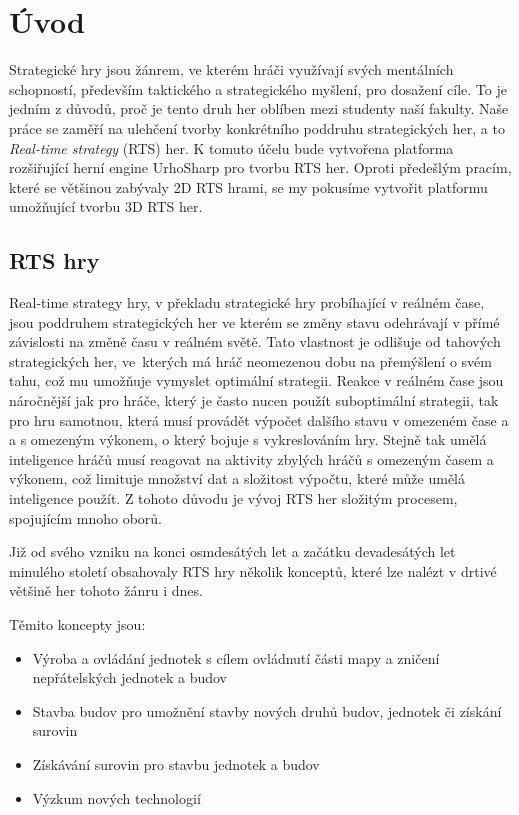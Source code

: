 \chapter{Úvod}

Strategické hry jsou žánrem, ve kterém hráči využívají svých mentálních schopností, především taktického a strategického myšlení, pro dosažení cíle. To je jedním z důvodů, proč je tento druh her oblíben mezi studenty naší fakulty. Naše práce se zaměří na ulehčení tvorby konkrétního poddruhu strategických her, a to \emph{Real-time strategy} (RTS) her. K tomuto účelu bude vytvořena platforma rozšiřující herní engine UrhoSharp pro tvorbu RTS her. Oproti předešlým pracím, které se většinou zabývaly 2D RTS hrami, se my pokusíme vytvořit platformu umožňující tvorbu 3D RTS her.

\section{RTS hry}
Real-time strategy hry, v překladu strategické hry probíhající v reálném čase, jsou poddruhem strategických her ve kterém se změny stavu odehrávají v přímé závislosti na změně času v reálném světě. Tato vlastnost je odlišuje od tahových strategických her, ve~kterých má hráč neomezenou dobu na přemýšlení o svém tahu, což mu umožňuje vymyslet optimální strategii. Reakce v reálném čase jsou náročnější jak pro hráče, který je často nucen použít suboptimální strategii, tak pro hru samotnou, která musí provádět výpočet dalšího stavu v omezeném čase a a s omezeným výkonem, o který bojuje s vykreslováním hry. Stejně tak umělá inteligence hráčů musí reagovat na aktivity zbylých hráčů s omezeným časem a výkonem, což limituje množství dat a složitost výpočtu, které může umělá inteligence použít. Z tohoto důvodu je vývoj RTS her složitým procesem, spojujícím mnoho oborů. 

Již od svého vzniku na konci osmdesátých let a začátku devadesátých let minulého století  obsahovaly RTS hry několik konceptů, které lze nalézt v drtivé většině her tohoto žánru i dnes. 

Těmito koncepty jsou:
\begin{itemize}
	\item Výroba a ovládání jednotek s cílem ovládnutí části mapy a zničení nepřátelských jednotek a budov
	\item Stavba budov pro umožnění stavby nových druhů budov, jednotek či získání surovin
	\item Získávání surovin pro stavbu jednotek a budov
	\item Výzkum nových technologií
\end{itemize}

